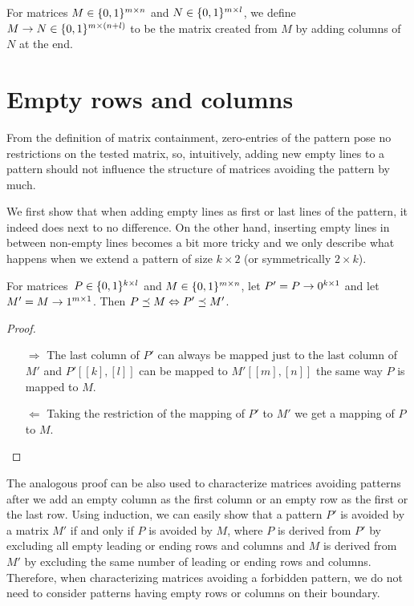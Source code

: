 \begin{defn}
For matrices $M\in\{0,1\}^{m\times n}$ and $N\in\{0,1\}^{m\times l}$, we define $M\rightarrow N\in\{0,1\}^{m\times(n+l)}$ to be the matrix created from $M$ by adding columns of~$N$ at the end.
\end{defn}

\section{Empty rows and columns}
\label{sec:empty}
From the definition of matrix containment, zero-entries of the pattern pose no restrictions on the tested matrix, so, intuitively, adding new empty lines to a pattern should not influence the structure of matrices avoiding the pattern by much.

We first show that when adding empty lines as first or last lines of the pattern, it indeed does next to no difference. On the other hand, inserting empty lines in between non-empty lines becomes a bit more tricky and we only describe what happens when we extend a pattern of size $k\times2$ (or symmetrically $2\times k$).

\begin{obs}
\label{obs:emptyrows}
For matrices~$P\in\{0,1\}^{k\times l}$ and $M\in\{0,1\}^{m\times n}$, let $P'=P\rightarrow0^{k\times1}$ and let $M'=M\rightarrow1^{m\times1}$. Then $P\preceq M\Leftrightarrow P'\preceq M'$.
\end{obs}
\begin{proof}
\begin{itemize}
	\item[$\Rightarrow$] The last column of $P'$ can always be mapped just to the last column of $M'$ and $P'[[k],[l]]$ can be mapped to $M'[[m],[n]]$ the same way $P$ is mapped to $M$.
	\item[$\Leftarrow$] Taking the restriction of the mapping of $P'$ to $M'$ we get a mapping of $P$ to $M$.
\end{itemize}
\end{proof}

The analogous proof can be also used to characterize matrices avoiding patterns after we add an empty column as the first column or an empty row as the first or the last row. Using induction, we can easily show that a pattern $P'$ is avoided by a matrix $M'$ if and only if $P$ is avoided by $M$, where $P$ is derived from $P'$ by excluding all empty leading or ending rows and columns and $M$ is derived from $M'$ by excluding the same number of leading or ending rows and columns. Therefore, when characterizing matrices avoiding a forbidden pattern, we do not need to consider patterns having empty rows or columns on their boundary.

